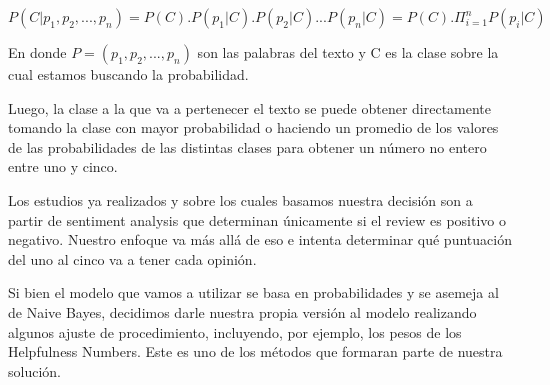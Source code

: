 \documentclass[a4paper,11pt]{report}
\begin{document}
\[ P(C|p_{1}, p_{2},...,p_{n}) = P(C).P(p_{1}|C).P(p_{2}|C)...P(p_{n}|C) = P(C).\Pi _{i=1}^{n}P(p_{i}|C)\]

En donde $ P = (p_{1}, p_{2},...,p_{n}) $ son las palabras del texto y C es la clase sobre la cual estamos buscando la probabilidad. 

Luego, la clase a la que va a pertenecer el texto se puede obtener directamente tomando la clase con mayor probabilidad o haciendo un promedio de los valores de las probabilidades de las distintas clases para obtener un número no entero entre uno y cinco.

Los estudios ya realizados y sobre los cuales basamos nuestra decisión son a partir de sentiment analysis que determinan únicamente si el review es positivo o negativo. Nuestro enfoque va más allá de eso e intenta determinar qué puntuación del uno al cinco va a tener cada opinión.

Si bien el modelo que vamos a utilizar se basa en probabilidades y se asemeja al de Naive Bayes, decidimos darle nuestra propia versión al modelo realizando algunos ajuste de procedimiento, incluyendo, por ejemplo, los pesos de los Helpfulness Numbers. Este es uno de los métodos que formaran parte de nuestra solución.
\end{document}
